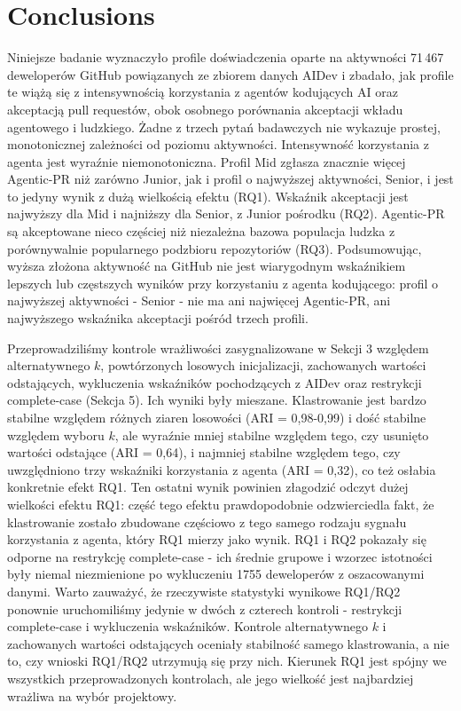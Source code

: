 \section{Conclusions\label{sec:conclusions}}
Niniejsze badanie wyznaczyło profile doświadczenia oparte na aktywności 71\,467 deweloperów GitHub powiązanych ze zbiorem danych AIDev i zbadało, jak profile te wiążą się z intensywnością korzystania z agentów kodujących AI oraz akceptacją pull requestów, obok osobnego porównania akceptacji wkładu agentowego i ludzkiego. Żadne z trzech pytań badawczych nie wykazuje prostej, monotonicznej zależności od poziomu aktywności. Intensywność korzystania z agenta jest wyraźnie niemonotoniczna. Profil Mid zgłasza znacznie więcej Agentic-PR niż zarówno Junior, jak i profil o najwyższej aktywności, Senior, i jest to jedyny wynik z dużą wielkością efektu (RQ1). Wskaźnik akceptacji jest najwyższy dla Mid i najniższy dla Senior, z Junior pośrodku (RQ2). Agentic-PR są akceptowane nieco częściej niż niezależna bazowa populacja ludzka z porównywalnie popularnego podzbioru repozytoriów (RQ3). Podsumowując, wyższa złożona aktywność na GitHub nie jest wiarygodnym wskaźnikiem lepszych lub częstszych wyników przy korzystaniu z agenta kodującego: profil o najwyższej aktywności - Senior - nie ma ani najwięcej Agentic-PR, ani najwyższego wskaźnika akceptacji pośród trzech profili.

Przeprowadziliśmy kontrole wrażliwości zasygnalizowane w Sekcji 3 względem alternatywnego $k$, powtórzonych losowych inicjalizacji, zachowanych wartości odstających, wykluczenia wskaźników pochodzących z AIDev oraz restrykcji complete-case (Sekcja 5). Ich wyniki były mieszane. Klastrowanie jest bardzo stabilne względem różnych ziaren losowości (ARI = 0,98-0,99) i dość stabilne względem wyboru $k$, ale wyraźnie mniej stabilne względem tego, czy usunięto wartości odstające (ARI = 0,64), i najmniej stabilne względem tego, czy uwzględniono trzy wskaźniki korzystania z agenta (ARI = 0,32), co też osłabia konkretnie efekt RQ1. Ten ostatni wynik powinien złagodzić odczyt dużej wielkości efektu RQ1: część tego efektu prawdopodobnie odzwierciedla fakt, że klastrowanie zostało zbudowane częściowo z tego samego rodzaju sygnału korzystania z agenta, który RQ1 mierzy jako wynik. RQ1 i RQ2 pokazały się odporne na restrykcję complete-case - ich średnie grupowe i wzorzec istotności były niemal niezmienione po wykluczeniu 1755 deweloperów z oszacowanymi danymi. Warto zauważyć, że rzeczywiste statystyki wynikowe RQ1/RQ2 ponownie uruchomiliśmy jedynie w dwóch z czterech kontroli - restrykcji complete-case i wykluczenia wskaźników. Kontrole alternatywnego $k$ i zachowanych wartości odstających oceniały stabilność samego klastrowania, a nie to, czy wnioski RQ1/RQ2 utrzymują się przy nich. Kierunek RQ1 jest spójny we wszystkich przeprowadzonych kontrolach, ale jego wielkość jest najbardziej wrażliwa na wybór projektowy.


